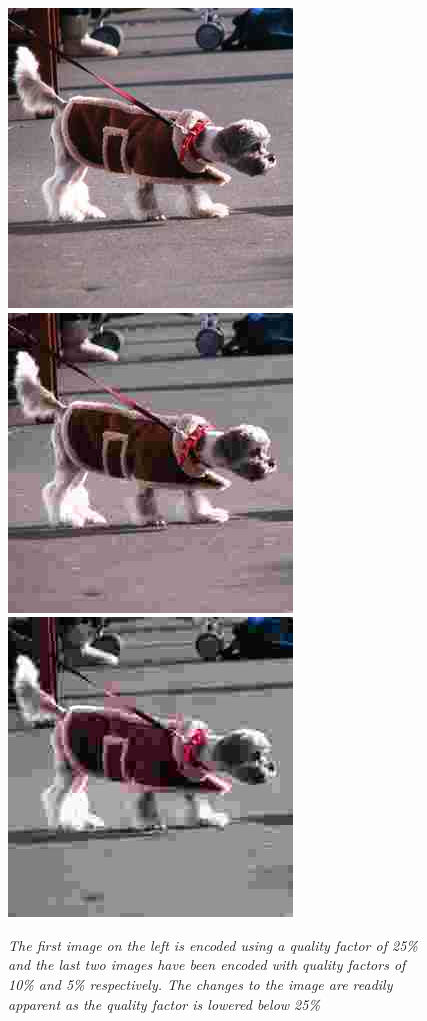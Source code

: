 \begin{figure}
\label{fig:jpglowquality}
\includegraphics{dog25}
\includegraphics{dog10}
\includegraphics{dog5}
\caption{\emph{The first image on the left is encoded using a quality factor of 25\% and the last two images have been encoded with quality factors of 10\% and 5\% respectively. The changes to the image are readily apparent as the quality factor is lowered below 25\%}}
\end{figure}

